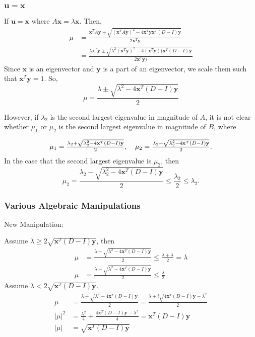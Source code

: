 \documentclass[11pt]{article}
\begin{document}
\subsubsection{$\mathbf{u}=\mathbf{x}$}
If $\mathbf{u}=\mathbf{x}$ where $A\mathbf{x}=\lambda \mathbf{x}$.
Then,
\begin{align}
    \mu &= \frac{\mathbf{x}^TA\mathbf{y}\pm\sqrt{(\mathbf{x}^TA\mathbf{y})^2-4\mathbf{x}^T\mathbf{y}\mathbf{x}^T(D-I)\mathbf{y}}}{2\mathbf{x}^T\mathbf{y}}\\
    &=\frac{\lambda \mathbf{x}^T\mathbf{y}\pm\sqrt{\lambda^2(\mathbf{x}^T\mathbf{y})^2-4(\mathbf{x}^T\mathbf{y})(\mathbf{x}^T(D-I)\mathbf{y}}}{2\mathbf{x}^T\mathbf{y})}
\end{align}
Since $\mathbf{x}$ is an eigenvector and $\mathbf{y}$ is a part of an eigenvector, we scale them such that $\mathbf{x}^T\mathbf{y}=1$.
So,
\begin{equation}
    \mu = \frac{\lambda\pm\sqrt{\lambda^2-4\mathbf{x}^T(D-I)\mathbf{y}}}{2}
\end{equation}

However, if $\lambda_2$ is the second largest eigenvalue in magnitude of $A$, it is not clear whether $\mu_1$ or $\mu_2$ is the second largest eigenvalue in magnitude of $B$, where

\[\begin{tabular}{cc}
    $\mu_1 = \frac{\lambda_2 + \sqrt{\lambda_2^2-4\mathbf{x}^T(D-I)\mathbf{y}}}{2}$,&$\mu_2 = \frac{\lambda_2 - \sqrt{\lambda_2^2-4\mathbf{x}^T(D-I)\mathbf{y}}}{2}$.  
\end{tabular}\]
In the case that the second largest eigenvalue is $\mu_2$, then
\[\mu_2=\frac{\lambda_2-\sqrt{\lambda_2^2-4\mathbf{x}^T(D-I)\mathbf{y}}}{2}\leq\frac{\lambda_2}{2}\leq\lambda_2.\]

\subsubsection{Various Algebraic Manipulations}

New Manipulation:

Assume $\lambda\geq 2\sqrt{\mathbf{x}^T(D-I)\mathbf{y}}$, then
\begin{align}
    \mu&=\frac{\lambda+\sqrt{\lambda^2-4\mathbf{x}^T(D-I)\mathbf{y}}}{2}\leq\frac{\lambda+\lambda}{2}=\lambda\\
    \mu&=\frac{\lambda-\sqrt{\lambda^2-4\mathbf{x}^T(D-I)\mathbf{y}}}{2}\leq\frac{\lambda}{2}
\end{align}
Assume $\lambda < 2\sqrt{\mathbf{x}^T(D-I)\mathbf{y}}$.
\begin{align}
    \mu&=\frac{\lambda\pm\sqrt{\lambda^2-4\mathbf{x}^T(D-I)\mathbf{y}}}{2}=\frac{\lambda\pm i\sqrt{4\mathbf{x}^T(D-I)\mathbf{y}-\lambda^2}}{2}\\
    |\mu|^2&=\frac{\lambda^2}{4}+\frac{4\mathbf{x}^T(D-I)\mathbf{y}-\lambda^2}{4}=\mathbf{x}^T(D-I)\mathbf{y}\\
    |\mu|&=\sqrt{\mathbf{x}^T(D-I)\mathbf{y}}
\end{align}
\end{document}
